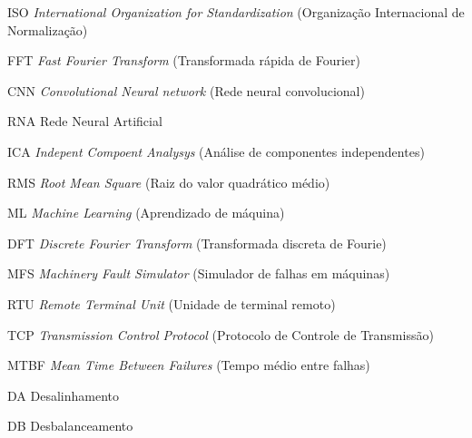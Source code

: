 \listoffigures*
\cleardoublepage
\listoftables*
\cleardoublepage
\begin{siglas}
\item[ISO] \textit{International Organization for Standardization} (Organização Internacional de Normalização)
\item[FFT] \textit{Fast Fourier Transform} (Transformada rápida de Fourier)
\item[CNN] \textit{Convolutional Neural network} (Rede neural convolucional)
\item[RNA] Rede Neural Artificial
\item[ICA] \textit{Indepent Compoent Analysys} (Análise de componentes independentes)
\item[RMS] \textit{Root Mean Square} (Raiz do valor quadrático médio)
\item[ML]  \textit{Machine Learning} (Aprendizado de máquina) 
\item[DFT] \textit{Discrete Fourier Transform} (Transformada discreta de Fourie)
\item[MFS] \textit{Machinery Fault Simulator} (Simulador de falhas em máquinas)
\item[RTU] \textit{Remote Terminal Unit} (Unidade de terminal remoto)
\item[TCP] \textit{Transmission Control Protocol}  (Protocolo de Controle de Transmissão) 
\item[MTBF]\textit{Mean Time Between Failures} (Tempo médio entre falhas) 
\item[DA] Desalinhamento
\item[DB] Desbalanceamento

\end{siglas}
